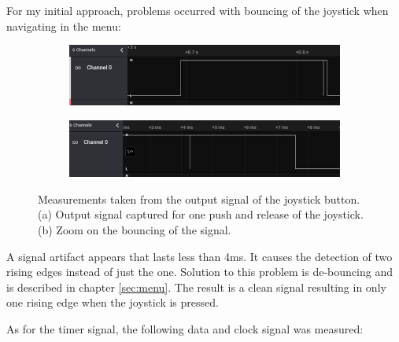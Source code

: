\documentclass[twocolumn]{article}
\begin{document}
	\newpage
	\vspace*{40px}
	
	For my initial approach, problems occurred with bouncing of the joystick when navigating in the menu:
	
	\begin{figure}[H]
		\centering
		\begin{subfigure}[b]{\columnwidth}
			\centering
			\includegraphics[width=\columnwidth]{debounce1.PNG}
			\caption{}
			\label{subfig3.1}
		\end{subfigure}
		 
		\begin{subfigure}[b]{\columnwidth}
			\centering
			\includegraphics[width=\columnwidth]{debounce2.PNG}
			\caption{}
			\label{subfig3.2}
		\end{subfigure}
		\caption{Measurements taken from the output signal of the joystick button. (a) Output signal captured for one push and release of the joystick. (b) Zoom on the bouncing of the signal.}
		\label{fig3}
	\end{figure}

	A signal artifact appears that lasts less than 4ms. It causes the detection of two rising edges instead of just the one. Solution to this problem is de-bouncing and is described in chapter \ref{sec:menu}. The result is a clean signal resulting in only one rising edge when the joystick is pressed.
	\newline
	
	As for the timer signal, the following data and clock signal was measured:
	
\end{document}
